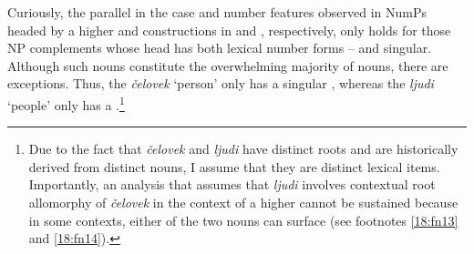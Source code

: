\documentclass[output=paper,modfonts,newtxmath,hidelinks]{langscibook}
\begin{document}
\noindent Curiously, the parallel in the case and number features observed in NumPs headed by a higher  and  constructions in  and , respectively, only holds for those NP complements whose head  has both lexical number forms –  and singular. Although such nouns constitute the overwhelming majority of  nouns, there are exceptions. Thus, the   \textit{čelovek} ‘person’ only has a singular , whereas the  \textit{ljudi} ‘people’ only has a  .\footnote{\label{18:fn2}Due to the fact that \textit{čelovek} and \textit{ljudi} have distinct roots and are historically derived from distinct nouns, I assume that they are distinct lexical items. Importantly, an analysis that assumes that \textit{ljudi} involves contextual root allomorphy of \textit{čelovek} in the context of a higher  cannot be sustained because in some contexts, either of the two nouns can surface (see footnotes \ref{18:fn13} and \ref{18:fn14}).
} 
\end{document}
